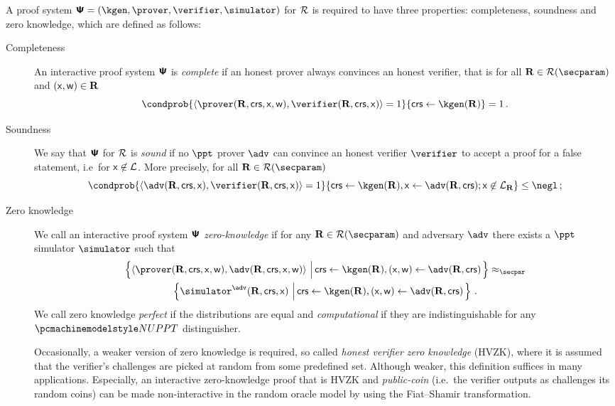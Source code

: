 \let\accentvec\vec \documentclass[runningheads,10pt]{llncs}
\begin{document}
A proof system $\proofsystem = (\kgen, \prover, \verifier, \simulator)$ for $\mathcal{R}$ is required to have three properties: completeness, soundness and zero knowledge, which are defined as follows:
\begin{description}
	\item[Completeness] An interactive proof system $\bm{\mathsf{\Psi}}$ is
			\emph{complete} if an honest prover always convinces an honest verifier,
			that is for all $\REL \in \RELGEN(\secparam)$ and $(\mathsf{x}, \mathsf{w}) \in \mathbf{R}$
	\[
		\condprob{\ip{\prover (\REL, \crs, \inp, \wit)}{\verifier (\REL, \crs,
		\inp)} = 1}{\crs \gets \kgen(\REL)} = 1\,.
	\]
	\item[Soundness] We say that $\bm{\mathsf{\Psi}}$ for $\mathcal{R}$ is \emph{sound} if
			no $\ppt$ prover $\adv$ can convince an honest verifier $\verifier$ to
			accept a proof for a false statement, i.e~for $\mathsf{x} \not\in\mathcal{L}$. More
			precisely, for all $\REL \in \RELGEN(\secparam)$
	\[
		\condprob{\ip{\adv(\REL, \crs, \inp)}{\verifier(\REL, \crs, \inp)} =
		1}{\crs \gets \kgen(\REL), \inp \gets \adv(\REL, \crs); \inp \not\in \LANG_\REL} \leq \negl\,;
	\]
	\item[Zero knowledge] We call an interactive proof system $\bm{\mathsf{\Psi}}$
			\emph{zero-knowledge} if for any $\REL \in \RELGEN(\secparam)$ and adversary $\adv$ there exists a $\ppt$ simulator $\simulator$ such that
	\begin{multline*}
	  \left\{\ip{\prover(\REL, \crs, \inp, \wit)}{\adv(\REL, \crs, \inp, \wit)} \,\left|\, \crs \gets \kgen(\REL), (\inp, \wit) \gets \adv(\REL, \crs)\vphantom{\simulator^\adv}\right.\right\} \approx_\secpar
		\\
		\left\{\simulator^{\adv}(\REL, \crs, \inp)\,\left|\, \crs \gets \kgen(\REL), (\inp, \wit) \gets \adv(\REL, \crs)\vphantom{\simulator^\adv}\right.\right\}\,.
	\end{multline*}
	We call zero knowledge \emph{perfect} if the distributions are equal and
	\emph{computational} if they are indistinguishable for any $\nuppt$ distinguisher.

	Occasionally, a weaker version of zero knowledge is required, so called
	\emph{honest verifier zero knowledge} (HVZK), where it is assumed that the
	verifier's challenges are picked at random from some predefined set.
	Although weaker, this definition suffices in many applications. Especially,
	an interactive zero-knowledge proof that is HVZK and \emph{public-coin}
	(i.e.~the verifier outputs as challenges its random coins) can be made
	non-interactive in the random oracle model by using the Fiat--Shamir
	transformation. 
	

\end{description}
\end{document}
